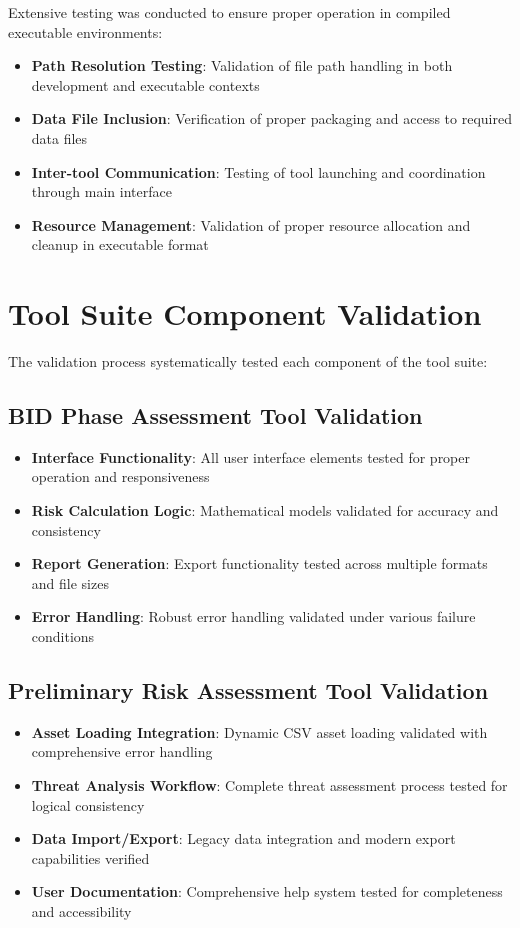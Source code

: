 \documentclass[binding=0.6cm]{sapthesis}
\begin{document}
Extensive testing was conducted to ensure proper operation in compiled executable environments:

\begin{itemize}
    \item \textbf{Path Resolution Testing}: Validation of file path handling in both development and executable contexts
    \item \textbf{Data File Inclusion}: Verification of proper packaging and access to required data files
    \item \textbf{Inter-tool Communication}: Testing of tool launching and coordination through main interface
    \item \textbf{Resource Management}: Validation of proper resource allocation and cleanup in executable format
\end{itemize}

\section{Tool Suite Component Validation}

The validation process systematically tested each component of the tool suite:

\subsection{BID Phase Assessment Tool Validation}

\begin{itemize}
    \item \textbf{Interface Functionality}: All user interface elements tested for proper operation and responsiveness
    \item \textbf{Risk Calculation Logic}: Mathematical models validated for accuracy and consistency
    \item \textbf{Report Generation}: Export functionality tested across multiple formats and file sizes
    \item \textbf{Error Handling}: Robust error handling validated under various failure conditions
\end{itemize}

\subsection{Preliminary Risk Assessment Tool Validation}

\begin{itemize}
    \item \textbf{Asset Loading Integration}: Dynamic CSV asset loading validated with comprehensive error handling
    \item \textbf{Threat Analysis Workflow}: Complete threat assessment process tested for logical consistency
    \item \textbf{Data Import/Export}: Legacy data integration and modern export capabilities verified
    \item \textbf{User Documentation}: Comprehensive help system tested for completeness and accessibility
\end{itemize}
\end{document}
